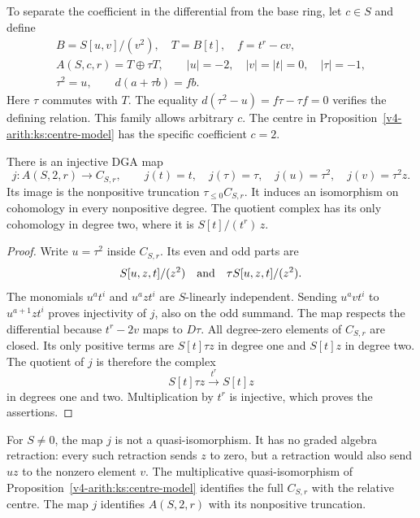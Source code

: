 To separate the coefficient in the differential from the base ring,
let $c\in S$ and define
\begin{equation}\label{v4-arith:ks:coefficient-family}
 \begin{gathered}
 B=S[u,v]/(v^2),\quad T=B[t],\quad f=t^r-cv,\\
 A(S,c,r)=T\oplus\tau T,\qquad
 |u|=-2,\quad |v|=|t|=0,\quad |\tau|=-1,\\
 \tau^2=u,\qquad d(a+\tau b)=fb.
 \end{gathered}
\end{equation}
Here $\tau$ commutes with $T$.
The equality $d(\tau^2-u)=f\tau-\tau f=0$ verifies the defining relation.
This family allows arbitrary $c$.
The centre in Proposition~\ref{v4-arith:ks:centre-model} has the specific coefficient $c=2$.

\begin{proposition}
\label{v4-arith:ks:centre-truncation}
\ClaimStatusProvedHere{}
There is an injective DGA map
\[
 j:A(S,2,r)\longrightarrow C_{S,r},\qquad
 j(t)=t,\quad j(\tau)=\tau,\quad j(u)=\tau^2,\quad j(v)=\tau^2z.
\]
Its image is the nonpositive truncation $\tau_{\leq0}C_{S,r}$.
It induces an isomorphism on cohomology in every nonpositive degree.
The quotient complex has its only cohomology in degree two, where it is
$S[t]/(t^r)\,z$.
\end{proposition}

\begin{proof}
Write $u=\tau^2$ inside $C_{S,r}$.
Its even and odd parts are
\[
 S[u,z,t]/(z^2)\quad\hbox{and}\quad
 \tau S[u,z,t]/(z^2).
\]
The monomials $u^at^i$ and $u^azt^i$ are $S$-linearly independent.
Sending $u^avt^i$ to $u^{a+1}zt^i$ proves injectivity of $j$,
also on the odd summand.
The map respects the differential because $t^r-2v$ maps to $D\tau$.
All degree-zero elements of $C_{S,r}$ are closed.
Its only positive terms are $S[t]\tau z$ in degree one and $S[t]z$ in degree two.
The quotient of $j$ is therefore the complex
\[
 S[t]\tau z\xrightarrow{\ t^r\ }S[t]z
\]
in degrees one and two.
Multiplication by $t^r$ is injective, which proves the assertions.
\end{proof}

\begin{remark}
For $S\ne0$, the map $j$ is not a quasi-isomorphism.
It has no graded algebra retraction: every such retraction sends $z$ to zero,
but a retraction would also send $uz$ to the nonzero element $v$.
The multiplicative quasi-isomorphism of Proposition~\ref{v4-arith:ks:centre-model}
identifies the full $C_{S,r}$ with the relative centre.
The map $j$ identifies $A(S,2,r)$ with its nonpositive truncation.
\end{remark}

